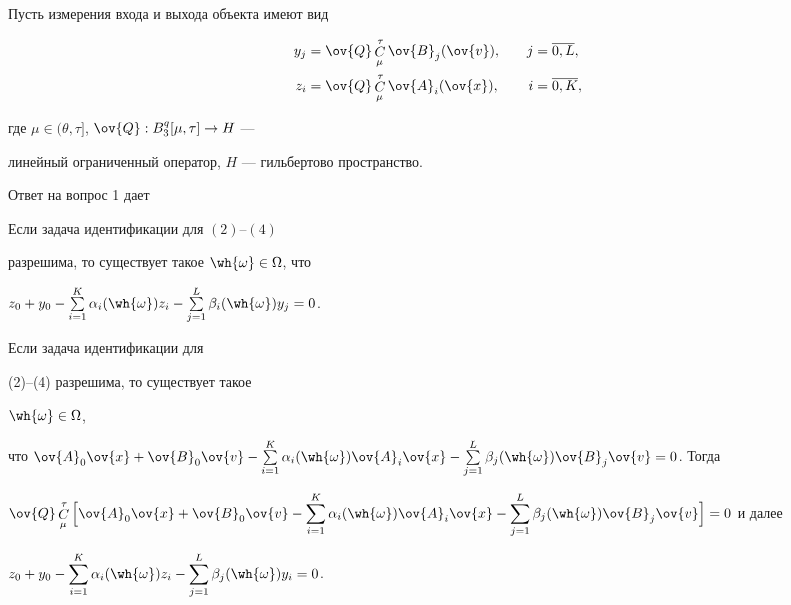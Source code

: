 Пусть измерения входа и выхода объекта имеют вид


\begin{alignat}{2}


y_j&=\ov{Q}\Cu_\mu^\tau\ov{B}_j(\ov{v}),&\quad


j&=\overline{0,L},\\


%


z_i&=\ov{Q}\Cu^\tau_\mu\ov{A}_i(\ov{x}),&\quad


i&=\overline{0,K},


\end{alignat}


где $\mu\in(\theta,\tau]$, $\ov{Q}:B_3^q[\mu,\tau]\to H$ ---


линейный ограниченный оператор, $H$ --- гильбертово пространство.





Ответ на вопрос 1 дает





\begin{thm}


Если задача идентификации для $(2)$--$(4)$


разрешима, то существует такое $\wh{\omega}\in\Omega$, что


$z_0+y_0-\sum\limits^K_{i=1}\alpha_i(\wh{\omega})z_i-


\sum\limits^L_{j=1}\beta_i(\wh{\omega})y_j=0$.


\end{thm}





\begin{pf}


Если задача идентификации для


(2)--(4) разрешима, то существует такое


$\wh{\omega}\in\Omega$,


что $\ov{A}_0\ov{x}+\ov{B}_0\ov{v} -


\sum\limits^K_{i=1}


\alpha_i(\wh{\omega})\ov{A}_i\ov{x}-


\sum\limits^L_{j=1}\beta_j(\wh{\omega})\ov{B}_j


\ov{v}=0$. Тогда


$\ov{Q}\Cu^\tau_\mu\Big[\ov{A}_0\ov{x}+\ov{B}_0\ov{v}-


\sum\limits^K_{i=1}\alpha_i(\wh{\omega})\ov{A}_i


\ov{x}-


\sum\limits^L_{j=1}\beta_j(\wh{\omega})\ov{B}_j


\ov{v}\Big] =0$ и далее


$z_0+y_0-\displaystyle\sum\limits^K_{i=1}\alpha_i(\wh{\omega})


z_i-\sum\limits^L_{j=1}\beta_j(\wh{\omega})y_i=0$.


\end{pf}





